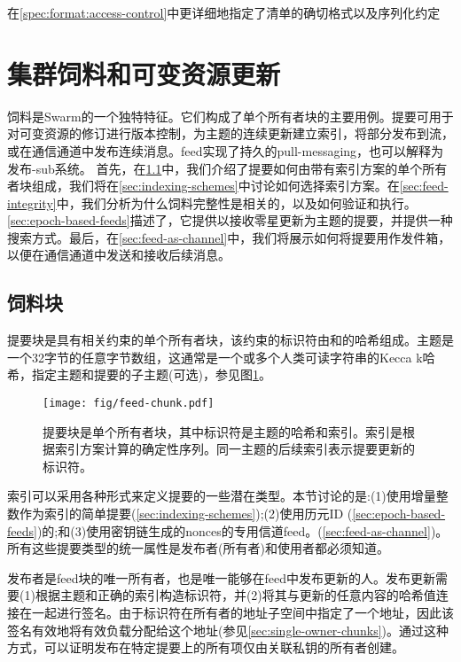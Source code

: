 在\ref{spec:format:access-control}中更详细地指定了清单的确切格式以及序列化约定



\section{集群饲料和可变资源更新\statusyellow}\label{sec:feeds}

\green{}

饲料是Swarm的一个独特特征。它们构成了单个所有者块的主要用例。提要可用于对可变资源的修订进行版本控制，为主题的连续更新建立索引，将部分发布到流，或在通信通道中发布连续消息。feed实现了持久的pull-messaging，也可以解释为发布-sub系统。
首先，在\ref{sec:feed-chunks}中，我们介绍了提要如何由带有索引方案的单个所有者块组成，我们将在\ref{sec:indexing-schemes}中讨论如何选择索引方案。在\ref{sec:feed-integrity}中，我们分析为什么饲料完整性是相关的，以及如何验证和执行。\ref{sec:epoch-based-feeds}描述了，它提供以接收零星更新为主题的提要，并提供一种搜索方式。最后，在\ref{sec:feed-as-channel}中，我们将展示如何将提要用作发件箱，以便在通信通道中发送和接收后续消息。


\subsection{饲料块\statusyellow}\label{sec:feed-chunks}

提要块是具有相关约束的单个所有者块，该约束的标识符由和的哈希组成。主题是一个32字节的任意字节数组，这通常是一个或多个人类可读字符串的Kecca k哈希，指定主题和提要的子主题(可选)，参见图\ref{fig:feed-chunk}。 


\begin{figure}[htbp]
\centering
\texttt{[image: fig/feed-chunk.pdf]}
\caption[饲料块\statusgreen]{提要块是单个所有者块，其中标识符是主题的哈希和索引。索引是根据索引方案计算的确定性序列。同一主题的后续索引表示提要更新的标识符。}
\label{fig:feed-chunk}
\end{figure}

索引可以采用各种形式来定义提要的一些潜在类型。本节讨论的是:(1)使用增量整数作为索引的简单提要(\ref{sec:indexing-schemes});(2)使用历元ID (\ref{sec:epoch-based-feeds})的;和(3)使用密钥链生成的nonces的专用信道feed。(\ref{sec:feed-as-channel})。
所有这些提要类型的统一属性是发布者(所有者)和使用者都必须知道。

发布者是feed块的唯一所有者，也是唯一能够在feed中发布更新的人。发布更新需要(1)根据主题和正确的索引构造标识符，并(2)将其与更新的任意内容的哈希值连接在一起进行签名。由于标识符在所有者的地址子空间中指定了一个地址，因此该签名有效地将有效负载分配给这个地址(参见\ref{sec:single-owner-chunks})。通过这种方式，可以证明发布在特定提要上的所有项仅由关联私钥的所有者创建。

